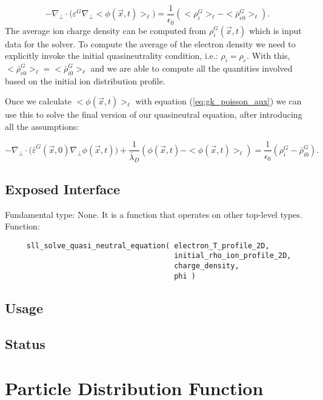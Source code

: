 \documentclass[]{report}   %
\begin{document}
\begin{equation} \label{eq:gk_poisson_aux}
- \nabla_{\perp} \cdot \big(\varepsilon ^G\nabla_{\perp} <\phi(\vec{x},t)>_{\ell} \big)= \frac{1}{\epsilon_0}(<\rho^G_i>_{\ell} - <\bar{\rho}_{e0}^G>_{\ell}).
\end{equation}
The average ion charge density can be computed from $\rho^G_i(\vec{x},t)$ which is input data for the solver. To compute the average of the electron density we need to explicitly invoke the initial quasineutrality condition, i.e.: $\rho_i = \rho_e$. With this, $<\bar{\rho}^G_{e0}>_{\ell} = <\bar{\rho}^G_{i0}>_{\ell}$ and we are able to compute all the quantities involved based on the initial ion distribution profile.

Once we calculate $<\phi(\vec{x},t)>_{\ell}$ with equation (\ref{eq:gk_poisson_aux}) we can use this to solve the final version of our quasineutral equation, after introducing all the assumptions:

\begin{equation} \label{eq:gk_poisson_final}
- \nabla_{\perp} \cdot \big(\bar{\varepsilon}^G(\vec{x},0)\nabla_{\perp} \phi(\vec{x},t) \big)+\frac{1}{\bar{\lambda}_D} (\phi(\vec{x},t) - <\phi(\vec{x},t)>_{\ell})= \frac{1}{\epsilon_0}(\rho^G_i - \bar{\rho}_{i0}^G).
\end{equation}


 
\subsection{Exposed Interface}
Fundamental type: None. It is a function that operates on other top-level types. Function:
\begin{verbatim}
     sll_solve_quasi_neutral_equation( electron_T_profile_2D,
                                       initial_rho_ion_profile_2D,
                                       charge_density,
                                       phi )
\end{verbatim}
\subsection{Usage}
\subsection{Status}


\section{Particle Distribution Function}
\end{document}
